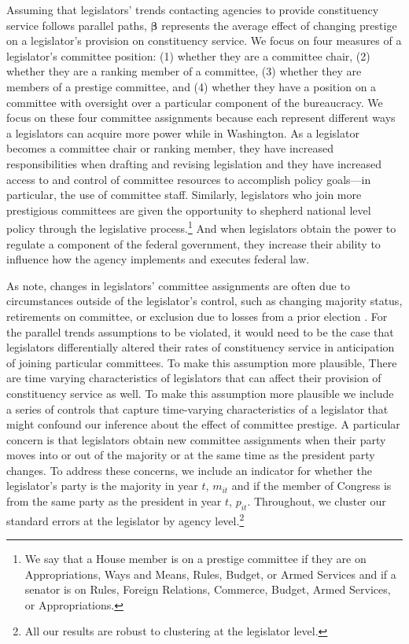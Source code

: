 \documentclass{article}
\begin{document}
Assuming that legislators' trends contacting agencies to provide constituency service follows parallel paths, $\boldsymbol{\beta}$ represents the average effect of changing prestige on a legislator's provision on constituency service.  We focus on four measures of a legislator's committee position: (1) whether they are a committee chair, (2) whether they are a ranking member of a committee, (3) whether they are members of a prestige committee, and (4) whether they have a position on a committee with oversight over a particular component of the bureaucracy.  We focus on these four committee assignments because each represent different ways a legislators can acquire more power while in Washington.  As a legislator becomes a committee chair or ranking member, they have increased responsibilities when drafting and revising legislation and they have increased access to and control of committee resources to accomplish policy goals---in particular, the use of committee staff.  Similarly, legislators who join more prestigious committees are given the opportunity to shepherd national level policy through the legislative process.\footnote{We say that a House member is on a prestige committee if they are on Appropriations, Ways and Means, Rules, Budget, or Armed Services and if a senator is on Rules, Foreign Relations, Commerce, Budget, Armed Services, or Appropriations.} And when legislators obtain the power to regulate a component of the federal government, they increase their ability to influence how the agency implements and executes federal law.    

As \cite{BerryFowler2016} note, changes in legislators' committee assignments are often due to circumstances outside of the legislator's control, such as changing majority status, retirements on committee, or exclusion due to losses from a prior election \citep{GrimmerPowell2013}.  For the parallel trends assumptions to be violated, it would need to be the case that legislators differentially altered their rates of constituency service in anticipation of joining particular committees.  To make this assumption more plausible, There are time varying characteristics of legislators that can affect their provision of constituency service as well.  To make this assumption more plausible we include a series of controls that capture time-varying characteristics of a legislator that might confound our inference about the effect of committee prestige. A particular concern is that legislators obtain new committee assignments when their party moves into or out of the majority or at the same time as the president party changes.  To address these concerns, we include an indicator for whether the legislator's party is the majority in year $t$, $m_{it}$ and if the member of Congress is from the same party as the president in year $t$, $p_{it}$.  Throughout, we cluster our standard errors at the legislator by agency level.\footnote{All our results are robust to clustering at the legislator level.} 
\end{document}
